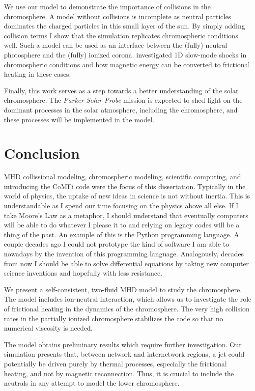 \documentclass[12pt,upcase]{umlthesis}
\begin{document}
We use our model to demonstrate the importance of collisions in the chromosphere. A model without collisions is incomplete as neutral particles dominates the charged particles in this small layer of the sun. By simply adding collision terms I show that the simulation replicates chromospheric conditions well. Such a model can be used as an interface between the (fully) neutral photosphere and the (fully) ionized corona. \citet{Hillier2016} investigated 1D slow-mode shocks in chromospheric conditions and how magnetic energy can be converted to frictional heating in these cases.

Finally, this work serves as a step towards a better understanding of the solar chromosphere. The {\it Parker Solar Probe\/} mission \citep{SolarProbe16} is expected to shed light on the dominant processes in the solar atmosphere, including the chromosphere, and these processes will be implemented in the model. 

\chapter{Conclusion}\label{chap:conclusion}

MHD collissional modeling, chromospheric modeling, scientific computing, and introducing the CoMFi code were the focus of this dissertation. Typically in the world of physics, the uptake of new ideas in science is not without inertia. This is understandable as I spend our time focusing on the physics above all else. If I take Moore's Law as a metaphor, I should understand that eventually computers will be able to do whatever I please it to and relying on legacy codes will be a thing of the past. An example of this is the Python programming language. A couple decades ago I could not prototype the kind of software I am able to nowadays by the invention of this programming language. Analogously, decades from now I should be able to solve differential equations by taking new computer science inventions and hopefully with less resistance.

We present a self-consistent, two-fluid MHD model to study the chromosphere. The model includes ion-neutral interaction, which allows us to investigate the role of frictional heating in the dynamics of the chromosphere.  The very high collision rates in the partially ionized chromosphere stabilizes the code so that no numerical viscosity is needed.  

The model obtains preliminary results which require further investigation. Our simulation presents that, between network and internetwork regions, a jet could potentially be driven purely by thermal processes, especially the frictional heating, and not by magnetic reconnection. Thus, it is crucial to include the neutrals in any attempt to model the lower chromosphere.
\end{document}
